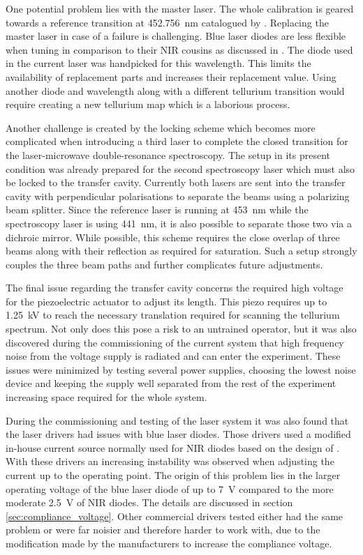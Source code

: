 One potential problem lies with the master laser. The whole calibration is geared towards a reference transition at \qty{452.756}{\nm} catalogued by \citeauthor{te_reference_lines} \cite{te_reference_lines}. Replacing the master laser in case of a failure is challenging. Blue laser diodes are less flexible when tuning in comparison to their NIR cousins as discussed in \cite{thesis_baus,thesis_alex}. The diode used in the current laser was handpicked for this wavelength. This limits the availability of replacement parts and increases their replacement value. Using another diode and wavelength along with a different tellurium transition would require creating a new tellurium map which is a laborious process.

Another challenge is created by the locking scheme which becomes more complicated when introducing a third laser to complete the closed transition for the laser-microwave double-resonance spectroscopy. The setup in its present condition was already prepared for the second spectroscopy laser which must also be locked to the transfer cavity. Currently both lasers are sent into the transfer cavity with perpendicular polarisations to separate the beams using a polarizing beam splitter. Since the reference laser is running at \qty{453}{\nm} while the spectroscopy laser is using \qty{441}{\nm}, it is also possible to separate those two via a dichroic mirror. While possible, this scheme requires the close overlap of three beams along with their reflection as required for saturation. Such a setup strongly couples the three beam paths and further complicates future adjustments.

The final issue regarding the transfer cavity concerns the required high voltage for the piezoelectric actuator to adjust its length. This piezo requires up to \qty{1.25}{\kV} to reach the necessary translation required for scanning the tellurium spectrum. Not only does this pose a risk to an untrained operator, but it was also discovered during the commissioning of the current system that high frequency noise from the voltage supply is radiated and can enter the experiment. These issues were minimized by testing several power supplies, choosing the lowest noise device and keeping the supply well separated from the rest of the experiment increasing space required for the whole system.

During the commissioning and testing of the laser system it was also found that the laser drivers had issues with blue laser diodes. Those drivers used a modified in-house current source normally used for NIR diodes based on the design of \citeauthor{libbrecht_hall} \cite{libbrecht_hall}. With these drivers an increasing instability was observed when adjusting the current up to the operating point. The origin of this problem lies in the larger operating voltage of the blue laser diode of up to \qty{7}{\V} compared to the more moderate \qty{2.5}{\V} of NIR diodes. The details are discussed in section \ref{sec:compliance_voltage}. Other commercial drivers tested either had the same problem or were far noisier and therefore harder to work with, due to the modification made by the manufacturers to increase the compliance voltage.

